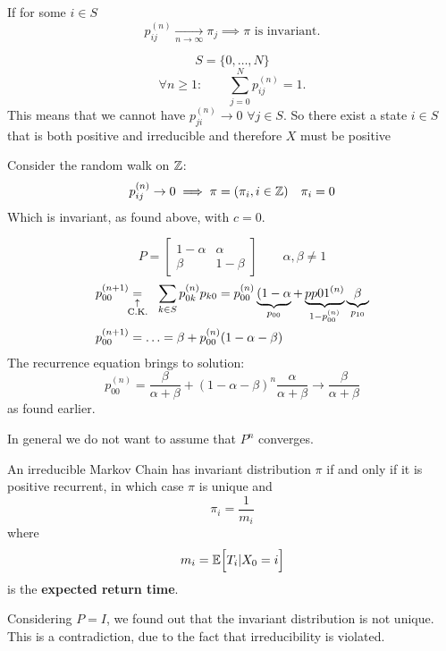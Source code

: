 \documentclass{article}
\begin{document}
	\begin{proposition}
		If for some $i\in S$ \[
		p_{ij}^{(n)}\xrightarrow[n\rightarrow\infty]{}\pi_j\implies\pi\text{ is invariant.}
		\]
	\end{proposition}
	\begin{proof2}
		\[S=\{0,\ldots,N\}\]
		\[\forall n\geqslant1:\qquad\sum_{j=0}^N p_{ij}^{(n)}=1. \]
		This means that we cannot have $p_{ji}^{(n)}\rightarrow 0$ $\forall j\in S$. So there exist a state $i \in S$ that is both positive and irreducible and therefore $X$ must be positive
	\end{proof2} 
	\begin{example}
		Consider the random walk on $\mathbb{Z}$:
		\[p_{ij}^{(n)}\rightarrow0\implies\pi=(\pi_i,i\in\mathbb{Z})\quad\pi_i=0\]
		Which is invariant, as found above, with $c=0$.
	\end{example}
	\begin{example}
		\[
		P=\begin{bmatrix}
			1-\alpha & \alpha \\
			\beta & 1-\beta
		\end{bmatrix}\qquad\alpha,\beta\neq 1
		\]
		\begin{align*}
			p_{00}^{(n+1)}&\equalexpl{\text{C.K.}}\hspace{1em}\sum_{k\in S}p_{0k}^{(n)}p_{k0}=p_{00}^{(n)}\underbrace{(1-\alpha}_{p_{00}}+\underbrace{pp{01}^{(n)}}_{1-p_{00}^{(n)}}\underbrace{\beta}_{p_{10}}\\
			p_{00}^{(n+1)}&=\ldots=\beta+p_{00}^{(n)}(1-\alpha-\beta)
		\end{align*}
		The recurrence equation brings to solution:
		\[p_{00}^{(n)}=\frac{\beta}{\alpha+\beta}+(1-\alpha-\beta)^n\frac{\alpha}{\alpha+\beta}\rightarrow\frac{\beta}{\alpha+\beta}\]
		as found earlier.
	\end{example}
	In general we do not want to assume that $P^n$ converges.
	\begin{theorem}
		An irreducible Markov Chain has invariant distribution $\pi$ if and only if it is positive recurrent, in which case $\pi$ is unique and 
		\begin{equation*}
			\pi_i = \frac{1}{m_i}
		\end{equation*}
		where 
		\begin{equation*}
			m_i = \mathbb{E}\Bigl[{T_i | X_0 = i}\Bigr]
		\end{equation*}
		is the \textbf{expected return time}. 
	\end{theorem}
	\begin{example}
		Considering $P=I$, we found out that the invariant distribution is not unique. This is a contradiction, due to the fact that irreducibility is violated.
	\end{example}
\end{document}
